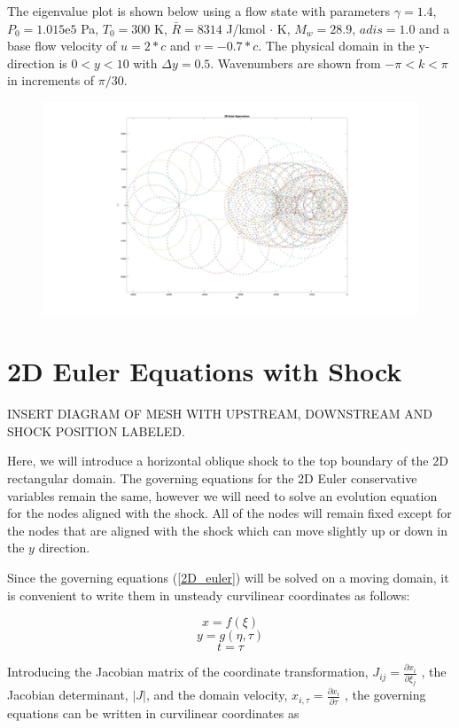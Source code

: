 \documentclass[10pt]{article}
\begin{document}
	The eigenvalue plot is shown below using a flow state with parameters $\gamma = 1.4$, $P_0 = 1.015\mathrm{e}5$ Pa, $T_0 = 300$ K, $\bar{R} = 8314$ J/kmol $\cdot$ K, $M_w = 28.9$, $adis = 1.0$ and a base flow velocity of $u=2*c$ and $v=-0.7*c$. The physical domain in the y-direction is $0<y<10$ with $\Delta y = 0.5$. Wavenumbers are shown from $-\pi<k<\pi$ in increments of $\pi/30$.
	
	\begin{figure}[h]
		\includegraphics[width=16cm]{2D_euler_eig}
		\centering
	\end{figure}
	
	
	\section{2D Euler Equations with Shock}
	
	INSERT DIAGRAM OF MESH WITH UPSTREAM, DOWNSTREAM AND SHOCK POSITION LABELED.
	
	Here, we will introduce a horizontal oblique shock to the top boundary of the 2D rectangular domain. The governing equations for the 2D Euler conservative variables remain the same, however we will need to solve an evolution equation for the nodes aligned with the shock. All of the nodes will remain fixed except for the nodes that are aligned with the shock which can move slightly up or down in the $y$ direction.
	
	Since the governing equations (\ref{2D_euler}) will be solved on a moving domain, it is convenient to write them in unsteady curvilinear coordinates as follows:
	
	$$ x = f(\xi) $$
	$$ y = g(\eta,\tau) $$
	$$ t = \tau $$
	
	Introducing the Jacobian matrix of the coordinate transformation, $J_{ij} = \frac{\partial x_i}{\partial \xi_j}$ , the Jacobian determinant, $|J|$, and the domain velocity, $x_{i,\tau} = \frac{\partial x_i}{\partial \tau}$ , the governing equations can be written in curvilinear coordinates as
	
\end{document}
